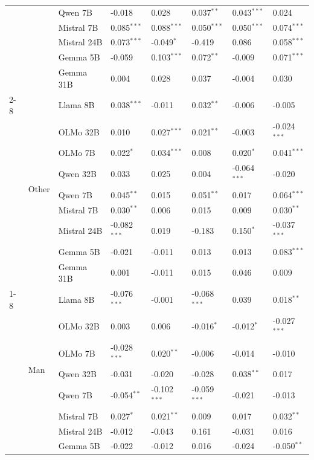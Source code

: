 \begin{longtable}[t]{llllllll}
 &  & Qwen 7B & -0.018 & 0.028 & 0.037$^{**}$ & 0.043$^{***}$ & 0.024 \\
 &  & Mistral 7B & 0.085$^{***}$ & 0.088$^{***}$ & 0.050$^{***}$ & 0.050$^{***}$ & 0.074$^{***}$ \\
 &  & Mistral 24B & 0.073$^{***}$ & -0.049$^{*}$ & -0.419 & 0.086 & 0.058$^{***}$ \\
 &  & Gemma 5B & -0.059 & 0.103$^{***}$ & 0.072$^{**}$ & -0.009 & 0.071$^{***}$ \\
 &  & Gemma 31B & 0.004 & 0.028 & 0.037 & -0.004 & 0.030 \\
\cline{2-8}
 & \multirow[t]{9}{*}{Other} & Llama 8B & 0.038$^{***}$ & -0.011 & 0.032$^{**}$ & -0.006 & -0.005 \\
 &  & OLMo 32B & 0.010 & 0.027$^{***}$ & 0.021$^{**}$ & -0.003 & -0.024$^{***}$ \\
 &  & OLMo 7B & 0.022$^{*}$ & 0.034$^{***}$ & 0.008 & 0.020$^{*}$ & 0.041$^{***}$ \\
 &  & Qwen 32B & 0.033 & 0.025 & 0.004 & -0.064$^{***}$ & -0.020 \\
 &  & Qwen 7B & 0.045$^{**}$ & 0.015 & 0.051$^{**}$ & 0.017 & 0.064$^{***}$ \\
 &  & Mistral 7B & 0.030$^{**}$ & 0.006 & 0.015 & 0.009 & 0.030$^{**}$ \\
 &  & Mistral 24B & -0.082$^{***}$ & 0.019 & -0.183 & 0.150$^{*}$ & -0.037$^{***}$ \\
 &  & Gemma 5B & -0.021 & -0.011 & 0.013 & 0.013 & 0.083$^{***}$ \\
 &  & Gemma 31B & 0.001 & -0.011 & 0.015 & 0.046 & 0.009 \\
\cline{1-8} \cline{2-8}
\multirow[t]{27}{*}{Gender} & \multirow[t]{9}{*}{Man} & Llama 8B & -0.076$^{***}$ & -0.001 & -0.068$^{***}$ & 0.039 & 0.018$^{**}$ \\
 &  & OLMo 32B & 0.003 & 0.006 & -0.016$^{*}$ & -0.012$^{*}$ & -0.027$^{***}$ \\
 &  & OLMo 7B & -0.028$^{***}$ & 0.020$^{**}$ & -0.006 & -0.014 & -0.010 \\
 &  & Qwen 32B & -0.031 & -0.020 & -0.028 & 0.038$^{**}$ & 0.017 \\
 &  & Qwen 7B & -0.054$^{**}$ & -0.102$^{***}$ & -0.059$^{***}$ & -0.021 & -0.013 \\
 &  & Mistral 7B & 0.027$^{*}$ & 0.021$^{**}$ & 0.009 & 0.017 & 0.032$^{**}$ \\
 &  & Mistral 24B & -0.012 & -0.043 & 0.161 & -0.031 & 0.016 \\
 &  & Gemma 5B & -0.022 & -0.012 & 0.016 & -0.024 & -0.050$^{**}$ \\

\end{longtable}
